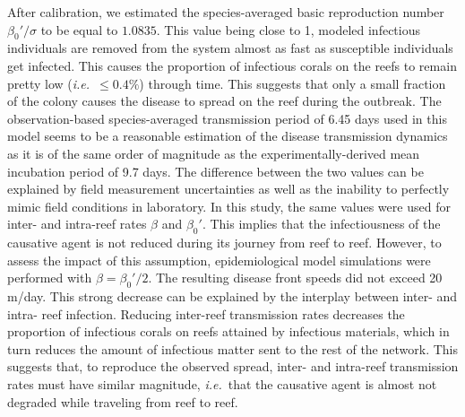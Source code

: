 \documentclass[utf8]{frontiersSCNS}
\newcommand{\ie}{{\it i.e.}\ }
\newcommand{\dobby}[1]{\textbf{\color{violet}{#1}}}
\begin{document}

After calibration, we estimated the species-averaged basic reproduction number $\beta_0'/\sigma$ to be equal to $1.0835$. This value being close to 1, modeled infectious individuals are removed from the system almost as fast as susceptible individuals get infected. This causes the proportion of infectious corals on the reefs to remain pretty low (\ie $\leq 0.4\%$) through time. This suggests that only a small fraction of the colony causes the disease to spread on the reef during the outbreak. The observation-based species-averaged transmission period of 6.45 days used in this model seems to be a reasonable estimation of the disease transmission dynamics as it is of the same order of magnitude as the experimentally-derived mean incubation period of 9.7 days. The difference between the two values can be explained by field measurement uncertainties as well as the inability to perfectly mimic field conditions in laboratory. In this study, the same values were used for inter- and intra-reef rates $\beta$ and $\beta_0'$. This implies that the infectiousness of the causative agent is not reduced during its journey from reef to reef. However, to assess the impact of this assumption, epidemiological model simulations were performed with $\beta=\beta_0'/2$. The resulting disease front speeds did not exceed 20 m/day. This strong decrease can be explained by the interplay between inter- and intra- reef infection. Reducing inter-reef transmission rates decreases the proportion of infectious corals on reefs attained by infectious materials, which in turn reduces the amount of infectious matter sent to the rest of the network. This suggests that, to reproduce the observed spread, inter- and intra-reef transmission rates must have similar magnitude, \ie that the causative agent is almost not degraded while traveling from reef to reef. \dobby{Is this consistent with Rhodobacterales and Rhizobiales ?}

\end{document}
